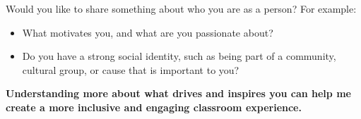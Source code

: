 \documentclass{ximera}
\author{Bart Snapp}
\begin{document}
\begin{question}
    Would you like to share something about who you are as a person? For example:
    \begin{itemize}
        \item What motivates you, and what are you passionate about?
        \item Do you have a strong social identity, such as being part of a
              community, cultural group, or cause
              that is important to you?
    \end{itemize}
    \textbf{Understanding more about what drives and inspires you can help me
    create a more inclusive and engaging classroom experience.}
    \begin{freeResponse}
    \end{freeResponse}
\end{question}
\end{document}
